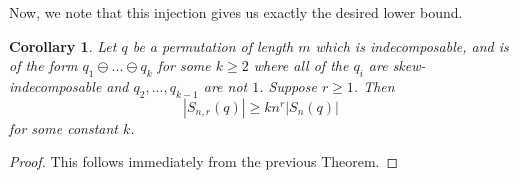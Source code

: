 \documentclass[11pt, final]{amsart}
\newtheorem{theorem}{Theorem}[section]								\newtheorem{proposition}[theorem]{Proposition}
\newtheorem{lemma}[theorem]{Lemma}
\newtheorem{corollary}[theorem]{Corollary}
\theoremstyle{remark}
\numberwithin{equation}{section}
\begin{document}
Now, we note that this injection gives us exactly the desired lower bound.
\begin{corollary}
    Let $q$ be a permutation of length $m$ which is indecomposable, and is of the form $q_1 \ominus ... \ominus q_k$ for some $k \geq 2$ where all of the $q_i$ are skew-indecomposable and $q_2, ..., q_{k-1}$ are not $1$. Suppose $r \geq 1$. Then
    \[
    |S_{n,r}(q)| \geq kn^r|S_{n}(q)|
    \]
    for some constant $k$.
\end{corollary}
\begin{proof}
    This follows immediately from the previous Theorem.
\end{proof}




\end{document}

